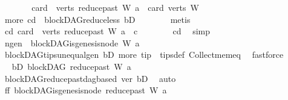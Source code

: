 \begin{isabellebody}
\ \ \ \ \isamarkupfalse%
\ \isamarkupfalse%
\ {\isachardoublequoteopen}card\ {\isacharparenleft}{\kern0pt}\ verts\ {\isacharparenleft}{\kern0pt}reduce{\isacharunderscore}{\kern0pt}past\ W\ a{\isacharparenright}{\kern0pt}{\isacharparenright}{\kern0pt}\ {\isacharless}{\kern0pt}\ card\ {\isacharparenleft}{\kern0pt}verts\ W{\isacharparenright}{\kern0pt}{\isachardoublequoteclose}\isanewline
\ \ \ \ \ \ \isamarkupfalse%
\ more\ cd\ \ blockDAG{\isachardot}{\kern0pt}reduce{\isacharunderscore}{\kern0pt}less\ bD\isanewline
\ \ \ \ \ \ \isamarkupfalse%
\ metis\ \isanewline
\ \ \ \ \isamarkupfalse%
\ \isamarkupfalse%
\ cd{}{\isacharcolon}{\kern0pt}\ {\isachardoublequoteopen}card\ {\isacharparenleft}{\kern0pt}\ verts\ {\isacharparenleft}{\kern0pt}reduce{\isacharunderscore}{\kern0pt}past\ W\ a{\isacharparenright}{\kern0pt}{\isacharparenright}{\kern0pt}\ {\isacharless}{\kern0pt}\ c{\isachardoublequoteclose}\isanewline
\ \ \ \ \ \ \isamarkupfalse%
\ cd\ \isamarkupfalse%
\ simp\isanewline
\ \ \ \ \isamarkupfalse%
\ n{\isacharunderscore}{\kern0pt}gen{\isacharcolon}{\kern0pt}\ {\isachardoublequoteopen}{\isasymnot}\ blockDAG{\isachardot}{\kern0pt}is{\isacharunderscore}{\kern0pt}genesis{\isacharunderscore}{\kern0pt}node\ W\ a{\isachardoublequoteclose}\isanewline
\ \ \ \ \ \ \isamarkupfalse%
\ blockDAG{\isachardot}{\kern0pt}tips{\isacharunderscore}{\kern0pt}unequal{\isacharunderscore}{\kern0pt}gen\ bD\ more\ tip\ \ tips{\isacharunderscore}{\kern0pt}def\ Collect{\isacharunderscore}{\kern0pt}mem{\isacharunderscore}{\kern0pt}eq\ \isamarkupfalse%
\ fastforce\isanewline
\ \ \ \ \isamarkupfalse%
\ \isamarkupfalse%
\ bD{}{\isacharcolon}{\kern0pt}\ {\isachardoublequoteopen}blockDAG\ {\isacharparenleft}{\kern0pt}reduce{\isacharunderscore}{\kern0pt}past\ W\ a{\isacharparenright}{\kern0pt}{\isachardoublequoteclose}\isanewline
\ \ \ \ \ \ \isamarkupfalse%
\ blockDAG{\isachardot}{\kern0pt}reduce{\isacharunderscore}{\kern0pt}past{\isacharunderscore}{\kern0pt}dagbased\ ver\ bD\ \isamarkupfalse%
\ auto\isanewline
\ \ \ \ \isamarkupfalse%
\ ff{\isacharcolon}{\kern0pt}\ {\isachardoublequoteopen}blockDAG{\isachardot}{\kern0pt}is{\isacharunderscore}{\kern0pt}genesis{\isacharunderscore}{\kern0pt}node\ {\isacharparenleft}{\kern0pt}reduce{\isacharunderscore}{\kern0pt}past\ W\ a{\isacharparenright}{\kern0pt}\isanewline

\end{isabellebody}
